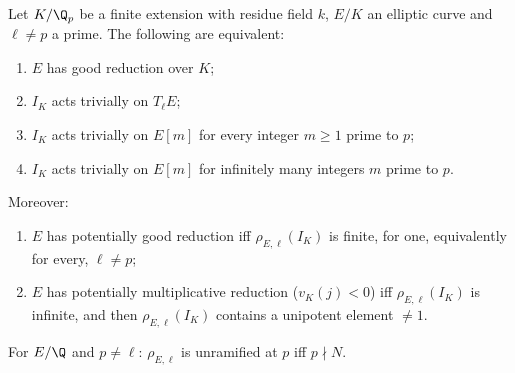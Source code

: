 \begin{theorem}\label{thm:galrep:nos}
Let $K/\Q_p$ be a finite extension with residue field $k$, $E/K$ an elliptic curve and $\ell\ne p$ a prime. The following are equivalent:
\begin{enumerate}[label=(\alph*)]
\item $E$ has good reduction over $K$;
\item $I_K$ acts trivially on $T_\ell E$;
\item $I_K$ acts trivially on $E[m]$ for every integer $m\ge1$ prime to $p$;
\item $I_K$ acts trivially on $E[m]$ for infinitely many integers $m$ prime to $p$.
\end{enumerate}
Moreover:
\begin{enumerate}[label=(\alph*),start=5]
\item $E$ has potentially good reduction iff $\rho_{E,\ell}(I_K)$ is finite, for one, equivalently for every, $\ell\ne p$;
\item $E$ has potentially multiplicative reduction ($v_K(j)<0$) iff $\rho_{E,\ell}(I_K)$ is infinite, and then $\rho_{E,\ell}(I_K)$ contains a unipotent
element $\ne1$.
\end{enumerate}
For $E/\Q$ and $p\ne\ell$: $\rho_{E,\ell}$ is unramified at $p$ iff $p\nmid N$.
\end{theorem}

